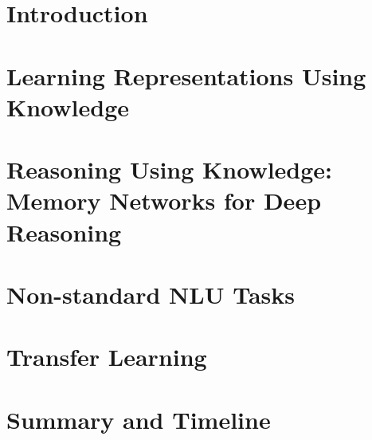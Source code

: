 \documentclass[12pt]{cmuthesis}
\begin{document}
% 



\tableofcontents
\listoffigures
\listoftables

\mainmatter


%
%
%
%
%


\chapter{Introduction}
\label{chapter:introduction}

\chapter{Learning Representations Using Knowledge}
\label{chapter:ontolstm}

\chapter{Reasoning Using Knowledge: Memory Networks for Deep Reasoning}
\label{chapter:memnet_qa}

\chapter{Non-standard NLU Tasks}
\label{chapter:other_tasks}

\chapter{Transfer Learning}
\label{chapter:transfer_learning}

\chapter{Summary and Timeline}

\end{document}
